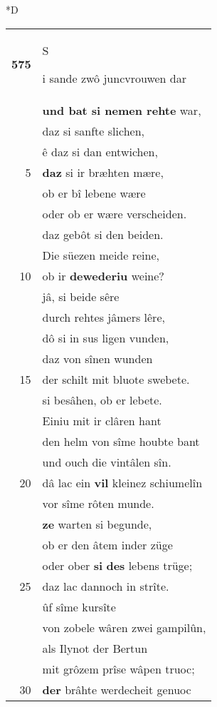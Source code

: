 \documentclass[8pt,a4paper,notitlepage]{article}
\begin{document}
\begin{table}[ht]
\begin{minipage}[t]{0.5\linewidth}
\small
\begin{center}*D
\end{center}
\begin{tabular}{rl}
\textbf{575} & \begin{large}S\end{large}i sande zwô juncvrouwen dar\\ 
 & \textbf{und bat si nemen rehte} war,\\ 
 & daz si sanfte slichen,\\ 
 & ê daz si dan entwichen,\\ 
5 & \textbf{daz} si ir bræhten mære,\\ 
 & ob er bî lebene wære\\ 
 & oder ob er wære verscheiden.\\ 
 & daz gebôt si den beiden.\\ 
 & Die süezen meide reine,\\ 
10 & ob ir \textbf{dewederiu} weine?\\ 
 & jâ, si beide sêre\\ 
 & durch rehtes jâmers lêre,\\ 
 & dô si in sus ligen vunden,\\ 
 & daz von sînen wunden\\ 
15 & der schilt mit bluote swebete.\\ 
 & si besâhen, ob er lebete.\\ 
 & Einiu mit ir clâren hant\\ 
 & den helm von sîme houbte bant\\ 
 & und ouch die vintâlen sîn.\\ 
20 & dâ lac ein \textbf{vil} kleinez schiumelîn\\ 
 & vor sîme rôten munde.\\ 
 & \textbf{ze} warten si begunde,\\ 
 & ob er den âtem inder züge\\ 
 & oder ober \textbf{si} \textbf{des} lebens trüge;\\ 
25 & daz lac dannoch in strîte.\\ 
 & ûf sîme kursîte\\ 
 & von zobele wâren zwei gampilûn,\\ 
 & als Ilynot der Bertun\\ 
 & mit grôzem prîse wâpen truoc;\\ 
30 & \textbf{der} brâhte werdecheit genuoc\\ 

\end{tabular}
\end{minipage}
\end{table}
\end{document}
